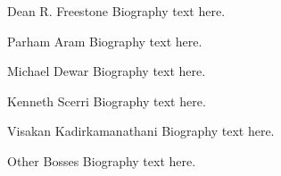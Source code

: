 \documentclass[onecolumn,draftcls]{IEEEtran}
\begin{document}
\begin{IEEEbiography}{Dean R. Freestone}
Biography text here.
\end{IEEEbiography}

\begin{IEEEbiography}{Parham Aram}
Biography text here.
\end{IEEEbiography}


\begin{IEEEbiography}{Michael Dewar}
Biography text here.
\end{IEEEbiography}

\begin{IEEEbiography}{Kenneth Scerri}
Biography text here.
\end{IEEEbiography}

\begin{IEEEbiography}{Visakan Kadirkamanathani}
Biography text here.
\end{IEEEbiography}

\begin{IEEEbiography}{Other Bosses}
Biography text here.
\end{IEEEbiography}

\end{document}
